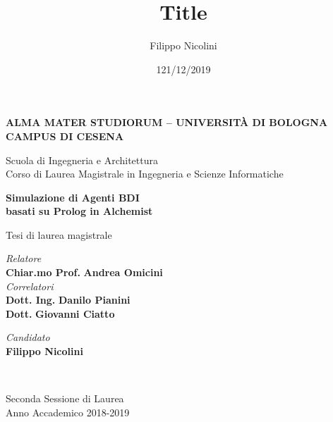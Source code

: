 \title{Title}
\author{Filippo Nicolini}
\date{121/12/2019}

\begin{titlepage}
    \begin{center}
        
        \large
        \textbf{ALMA MATER STUDIORUM -- UNIVERSITÀ DI BOLOGNA \\ CAMPUS DI CESENA}
    	\\
        \noindent\hrulefill
        \vspace{0.4cm}
        
        \Large
        Scuola di Ingegneria e Architettura \\
        Corso di Laurea Magistrale in Ingegneria e Scienze Informatiche
        
        \Huge
        \vspace{4cm}
        \textbf{Simulazione di Agenti BDI\\
        basati su Prolog in Alchemist}

        \large
        \vspace{1cm}
        Tesi di laurea magistrale
        
        \vspace{5.5cm}
        \begin{minipage}[t]{0.64\textwidth}
            \begin{flushleft}
                \textit{Relatore} 
                \\ 
                \textbf{Chiar.mo Prof.} \textbf{Andrea Omicini} 
                \\
                \vspace{0.4cm}
                \textit{Correlatori} 
                \\ 
                \textbf{Dott. Ing.} \textbf{Danilo Pianini}
                \\
                \textbf{Dott.} \textbf{Giovanni Ciatto}
            \end{flushleft}
        \end{minipage}
        \begin{minipage}[t]{0.34\textwidth}
            \begin{flushright}
                \textit{Candidato} 
                \\ 
                \textbf{Filippo Nicolini}
            \end{flushright}
        \end{minipage}\\
        
        \vfill
        \noindent\hrulefill
        \vspace{0.3cm}
        \Large
        
        Seconda Sessione di Laurea
        \\
        Anno Accademico 2018-2019
    \end{center}
\end{titlepage}
\restoregeometry